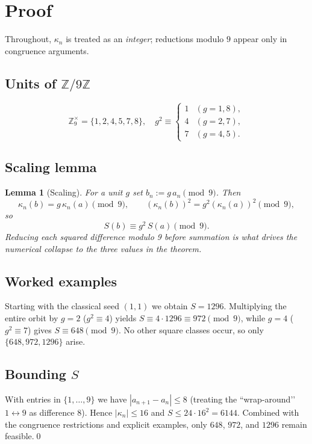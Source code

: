 \documentclass[12pt]{article}
\newtheorem{lem}{Lemma}
\begin{document}
\section{Proof}

Throughout, $\kappa_n$ is treated as an \emph{integer}; reductions modulo $9$
appear only in congruence arguments.

\subsection[Units of Z9]{Units of $\mathbb Z/9\mathbb Z$}

\[
\mathbb Z_9^{\times}=\{1,2,4,5,7,8\},\quad
g^{2}\equiv
\begin{cases}
1&(g=1,8),\\
4&(g=2,7),\\
7&(g=4,5).
\end{cases}
\]

\subsection{Scaling lemma}

\begin{lem}[Scaling]
For a unit $g$ set $b_n:=g\,a_n\pmod9$.  Then
\[
\kappa_n(b)=g\,\kappa_n(a)\pmod9,\qquad
(\kappa_n(b))^{2}=g^{2}(\kappa_n(a))^{2}\pmod9,
\]
so
\[
S(b)\equiv g^{2}\,S(a)\pmod9.
\]
Reducing each squared difference modulo 9 \emph{before} summation is what drives
the numerical collapse to the three values in the theorem.
\end{lem}

\subsection{Worked examples}

Starting with the classical seed $(1,1)$ we obtain $S=1296$.
Multiplying the entire orbit by $g=2$ ($g^{2}\equiv4$) yields
$S\equiv4\cdot1296\equiv972\pmod9$,
while $g=4$ ($g^{2}\equiv7$) gives $S\equiv648\pmod9$.
No other square classes occur, so only $\{648,972,1296\}$ arise.

\subsection[Bounding S]{Bounding $S$}

With entries in $\{1,\dots,9\}$ we have $|a_{n+1}-a_n|\le8$ (treating the
``wrap-around’’ $1\leftrightarrow9$ as difference 8).  Hence
$|\kappa_n|\le16$ and
\(S\le24\cdot16^{2}=6144\).
Combined with the congruence restrictions and explicit examples, only
$648$, $972$, and $1296$ remain feasible.\qed
\end{document}
